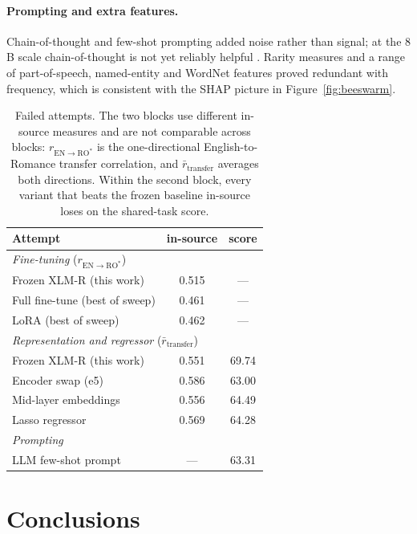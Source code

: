 \documentclass[11pt]{article}
\begin{document}
\paragraph{Prompting and extra features.}
Chain-of-thought and few-shot prompting added noise rather than signal;
at the $8$B scale chain-of-thought is not yet reliably helpful
\citep{wei2022cot}. Rarity measures and a range of part-of-speech,
named-entity and WordNet features proved redundant with frequency,
which is consistent with the SHAP picture in
Figure~\ref{fig:beeswarm}.

\begin{table}[tbp]
\centering\small
\begin{tabular}{lcc}
\toprule
\textbf{Attempt} & \textbf{in-source} & \textbf{score} \\
\midrule
\multicolumn{3}{l}{\emph{Fine-tuning} ($r_{\mathrm{EN}\rightarrow\mathrm{RO}^{*}}$)} \\
Frozen XLM-R (this work) & 0.515 & --- \\
Full fine-tune (best of sweep) & 0.461 & --- \\
LoRA (best of sweep) & 0.462 & --- \\
\midrule
\multicolumn{3}{l}{\emph{Representation and regressor} ($\bar{r}_{\mathrm{transfer}}$)} \\
Frozen XLM-R (this work) & 0.551 & 69.74 \\
Encoder swap (e5) & 0.586 & 63.00 \\
Mid-layer embeddings & 0.556 & 64.49 \\
Lasso regressor & 0.569 & 64.28 \\
\midrule
\multicolumn{3}{l}{\emph{Prompting}} \\
LLM few-shot prompt & --- & 63.31 \\
\bottomrule
\end{tabular}
\caption{Failed attempts. The two blocks use different in-source measures and are not comparable across blocks:
$r_{\mathrm{EN}\rightarrow\mathrm{RO}^{*}}$ is the one-directional English-to-Romance transfer correlation, and
$\bar{r}_{\mathrm{transfer}}$ averages both directions. Within the second block, every variant that beats the
frozen baseline in-source loses on the shared-task score.}
\label{tab:fail}
\end{table}

\section{Conclusions}
\label{section:conclusions}
\end{document}
